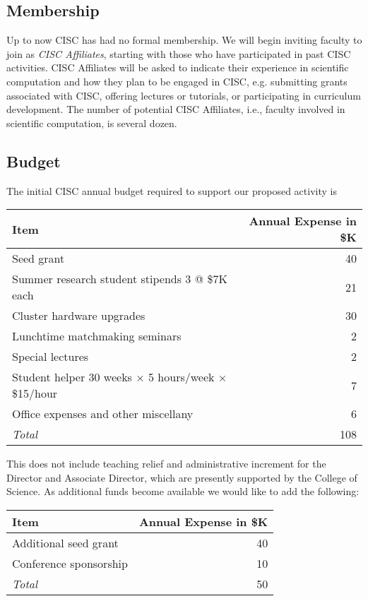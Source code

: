 \documentclass[12pt]{amsart}
\begin{document}
\subsection*{Membership} 
Up to now CISC has had no formal membership.  We will begin inviting faculty to join as \emph{CISC Affiliates}, starting with those who have participated in past CISC activities.  CISC Affiliates will be asked to indicate their experience in scientific computation and how they plan to be engaged in CISC, e.g. submitting grants associated with CISC, offering lectures or tutorials, or participating in curriculum development. The number of potential CISC Affiliates, i.e., faculty involved in scientific computation, is several dozen.  

\subsection*{Budget}
The initial CISC annual budget required to support our proposed activity is 
\begin{center}
    \begin{tabular}{p{}@{\qquad} r}
\textbf{Item} & \textbf{Annual Expense in \$K} \\
\toprule
    Seed grant  & 40 \\
    Summer research student stipends 3 @ \$7K each & 21 \\
    Cluster hardware upgrades & 30 \\
    Lunchtime matchmaking seminars & 2 \\
    Special lectures & 2 \\
    Student helper 30 weeks $\times$ 5 hours/week $\times$ \$15/hour & 7 \\
    Office expenses and other miscellany & 6 \\
    \bottomrule
    \emph{Total} & 108
\end{tabular}
\end{center}
This does not include teaching relief and administrative increment for the Director and Associate Director, which are presently supported by the College of Science.  As additional funds become available we would like to add the following:
\begin{center}
    \begin{tabular}{p{}@{\qquad} r}
\textbf{Item} & \textbf{Annual Expense in \$K} \\
\toprule
    Additional seed grant  & 40 \\
    Conference sponsorship & 10 \\
    \bottomrule
    \emph{Total} & 50
\end{tabular}
\end{center}
\end{document}
